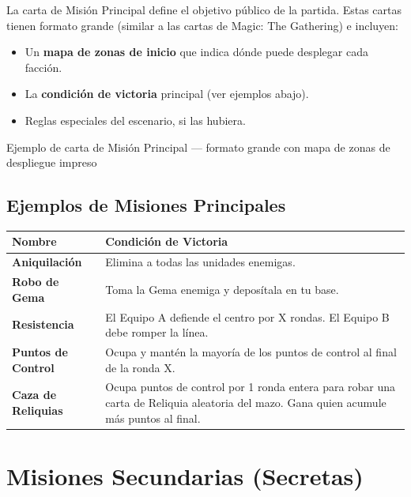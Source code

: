 La carta de Misión Principal define el objetivo público de la partida. Estas cartas tienen formato grande (similar a las cartas de Magic: The Gathering) e incluyen:

\begin{itemize}
    \item Un \textbf{mapa de zonas de inicio} que indica dónde puede desplegar cada facción.
    \item La \textbf{condición de victoria} principal (ver ejemplos abajo).
    \item Reglas especiales del escenario, si las hubiera.
\end{itemize}

\begin{imagebox}{Ejemplo de carta de Misión Principal — formato grande con mapa de zonas de despliegue impreso}
    \vspace{3cm}
\end{imagebox}

\subsection*{Ejemplos de Misiones Principales}

\begin{tabularx}{\linewidth}{|l|X|}
\hline
\rowcolor{HammerRed!15} \textbf{Nombre} & \textbf{Condición de Victoria} \\ \hline
\textbf{Aniquilación} & Elimina a todas las unidades enemigas. \\ \hline
\textbf{Robo de Gema} & Toma la Gema enemiga y deposítala en tu base. \\ \hline
\textbf{Resistencia} & El Equipo A defiende el centro por X rondas. El Equipo B debe romper la línea. \\ \hline
\textbf{Puntos de Control} & Ocupa y mantén la mayoría de los puntos de control al final de la ronda X. \\ \hline
\textbf{Caza de Reliquias} & Ocupa puntos de control por 1 ronda entera para robar una carta de Reliquia aleatoria del mazo. Gana quien acumule más puntos al final. \\ \hline
\end{tabularx}

\vspace{0.3cm}

\section{Misiones Secundarias (Secretas)}

